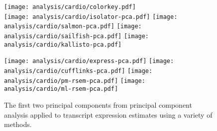 \documentclass{article}
\begin{document}
\begin{figure}[H]
\texttt{[image: analysis/cardio/colorkey.pdf]} \\
\texttt{[image: analysis/cardio/isolator-pca.pdf]}
\texttt{[image: analysis/cardio/salmon-pca.pdf]}
\texttt{[image: analysis/cardio/sailfish-pca.pdf]}
\texttt{[image: analysis/cardio/kallisto-pca.pdf]}
\end{figure}
\begin{figure}
\ContinuedFloat
\texttt{[image: analysis/cardio/express-pca.pdf]}
\texttt{[image: analysis/cardio/cufflinks-pca.pdf]}
\texttt{[image: analysis/cardio/pm-rsem-pca.pdf]}
\texttt{[image: analysis/cardio/ml-rsem-pca.pdf]}
\caption{The first two principal components from principal component analysis
applied to transcript expression estimates using a variety of methods.}
\label{fig:cardiopca}
\end{figure}
\end{document}
